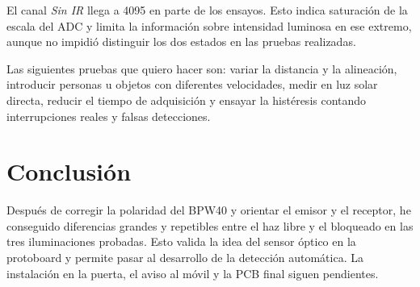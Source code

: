 \documentclass[11pt,a4paper]{article}
\begin{document}
El canal \emph{Sin IR} llega a 4095 en parte de los ensayos. Esto indica saturación de la escala del ADC y limita la información sobre intensidad luminosa en ese extremo, aunque no impidió distinguir los dos estados en las pruebas realizadas.

Las siguientes pruebas que quiero hacer son: variar la distancia y la alineación, introducir personas u objetos con diferentes velocidades, medir en luz solar directa, reducir el tiempo de adquisición y ensayar la histéresis contando interrupciones reales y falsas detecciones.

\section{Conclusión}
Después de corregir la polaridad del BPW40 y orientar el emisor y el receptor, he conseguido diferencias grandes y repetibles entre el haz libre y el bloqueado en las tres iluminaciones probadas. Esto valida la idea del sensor óptico en la protoboard y permite pasar al desarrollo de la detección automática. La instalación en la puerta, el aviso al móvil y la PCB final siguen pendientes.
\end{document}
